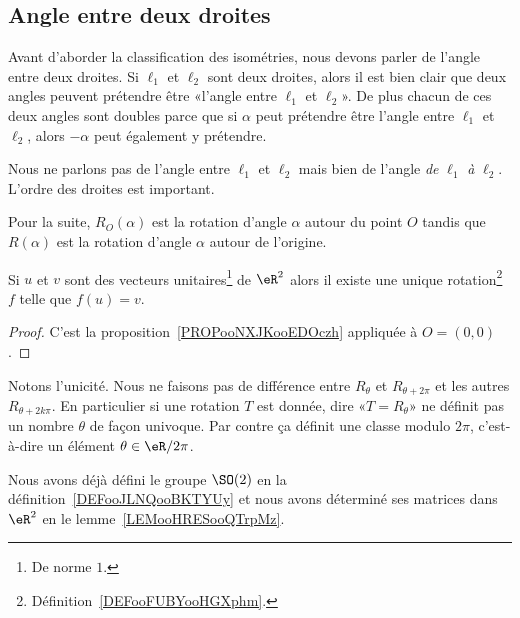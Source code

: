 \subsection{Angle entre deux droites}

Avant d'aborder la classification des isométries, nous devons parler de l'angle entre deux droites. Si \( \ell_1\) et \( \ell_2\) sont deux droites, alors il est bien clair que deux angles peuvent prétendre être «l'angle entre \( \ell_1\) et \( \ell_2\)». De plus chacun de ces deux angles sont doubles parce que si \( \alpha\) peut prétendre être l'angle entre \( \ell_1\) et \( \ell_2\), alors \( -\alpha\) peut également y prétendre.

\begin{remark}
	Nous ne parlons pas de l'angle entre \( \ell_1\) et \( \ell_2\) mais bien de l'angle \emph{de} \( \ell_1\) \emph{à} \( \ell_2\). L'ordre des droites est important.
\end{remark}

\begin{normaltext}
	Pour la suite, \( R_O(\alpha)\) est la rotation d'angle \( \alpha\) autour du point \( O\) tandis que \( R(\alpha)\) est la rotation d'angle \( \alpha\) autour de l'origine.
\end{normaltext}

\begin{proposition}      \label{PROPooDWIMooQPkobw}
	Si \( u\) et \( v\) sont des vecteurs unitaires\footnote{De norme \( 1\).} de \( \eR^2\) alors il existe une unique rotation\footnote{Définition~\ref{DEFooFUBYooHGXphm}.} \( f\) telle que \( f(u)=v\).
\end{proposition}

\begin{proof}
	C'est la proposition~\ref{PROPooNXJKooEDOczh} appliquée à \( O=(0,0)\).
\end{proof}

\begin{remark}
	Notons l'unicité. Nous ne faisons pas de différence entre \( R_{\theta}\) et \( R_{\theta+2\pi}\) et les autres \( R_{\theta+2k\pi}\). En particulier si une rotation \( T\) est donnée, dire «\( T=R_{\theta}\)» ne définit pas un nombre \( \theta\) de façon univoque. Par contre ça définit une classe modulo \( 2\pi\), c'est-à-dire un élément \( \theta\in \eR/2\pi\).

	Nous avons déjà défini le groupe \( \SO(2)\) en la définition~\ref{DEFooJLNQooBKTYUy} et nous avons déterminé ses matrices dans \( \eR^2\) en le lemme~\ref{LEMooHRESooQTrpMz}.
\end{remark}

